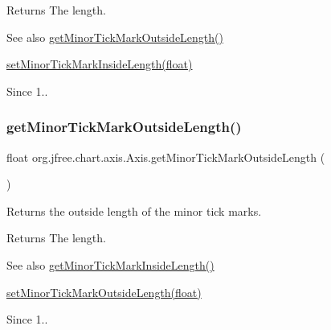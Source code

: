 \begin{DoxyReturn}{Returns}
The length.
\end{DoxyReturn}
\begin{DoxySeeAlso}{See also}
\mbox{\hyperlink{classorg_1_1jfree_1_1chart_1_1axis_1_1_axis_a0649fc67995cee80610a7b344fc84b76}{get\+Minor\+Tick\+Mark\+Outside\+Length()}} 

\mbox{\hyperlink{classorg_1_1jfree_1_1chart_1_1axis_1_1_axis_ab0f964e867920549fe0330bd94a6c0e2}{set\+Minor\+Tick\+Mark\+Inside\+Length(float)}}
\end{DoxySeeAlso}
\begin{DoxySince}{Since}
1.. 
\end{DoxySince}
\mbox{\label{classorg_1_1jfree_1_1chart_1_1axis_1_1_axis_a0649fc67995cee80610a7b344fc84b76}} 
\subsubsection{\texorpdfstring{get\+Minor\+Tick\+Mark\+Outside\+Length()}{getMinorTickMarkOutsideLength()}}
{\footnotesize\ttfamily float org.\+jfree.\+chart.\+axis.\+Axis.\+get\+Minor\+Tick\+Mark\+Outside\+Length (\begin{DoxyParamCaption}{ }\end{DoxyParamCaption})}

Returns the outside length of the minor tick marks.

\begin{DoxyReturn}{Returns}
The length.
\end{DoxyReturn}
\begin{DoxySeeAlso}{See also}
\mbox{\hyperlink{classorg_1_1jfree_1_1chart_1_1axis_1_1_axis_a99f2ec9bc2d5fb31247c7c6194ed5402}{get\+Minor\+Tick\+Mark\+Inside\+Length()}} 

\mbox{\hyperlink{classorg_1_1jfree_1_1chart_1_1axis_1_1_axis_a9c16bacaf75deb9b448085e067652426}{set\+Minor\+Tick\+Mark\+Outside\+Length(float)}}
\end{DoxySeeAlso}
\begin{DoxySince}{Since}
1.. 
\end{DoxySince}
\mbox{\label{classorg_1_1jfree_1_1chart_1_1axis_1_1_axis_a974e4dab4db47f7d25c7ef8ef8b20c6e}} 
